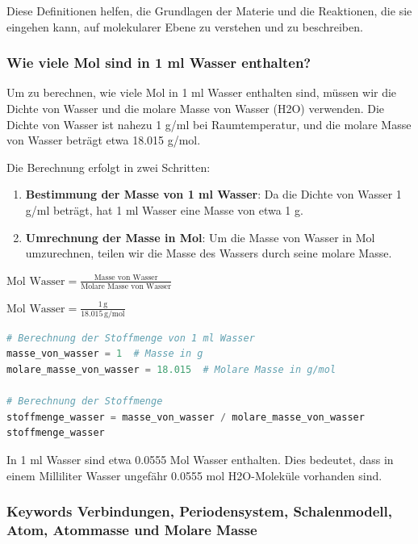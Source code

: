 \documentclass{vorlage-design-main}
\begin{document}
Diese Definitionen helfen, die Grundlagen der Materie und die
Reaktionen, die sie eingehen kann, auf molekularer Ebene zu verstehen
und zu beschreiben.

\hypertarget{wie-viele-mol-sind-in-1-ml-wasser-enthalten}{%
\subsubsection{Wie viele Mol sind in 1 ml Wasser
enthalten?}\label{wie-viele-mol-sind-in-1-ml-wasser-enthalten}}

Um zu berechnen, wie viele Mol in 1 ml Wasser enthalten sind, müssen wir
die Dichte von Wasser und die molare Masse von Wasser (H2O) verwenden.
Die Dichte von Wasser ist nahezu 1 g/ml bei Raumtemperatur, und die
molare Masse von Wasser beträgt etwa 18.015 g/mol.

Die Berechnung erfolgt in zwei Schritten:

\begin{enumerate}
\def\labelenumi{\arabic{enumi}.}

\item
  \textbf{Bestimmung der Masse von 1 ml Wasser}: Da die Dichte von
  Wasser 1 g/ml beträgt, hat 1 ml Wasser eine Masse von etwa 1 g.
\item
  \textbf{Umrechnung der Masse in Mol}: Um die Masse von Wasser in Mol
  umzurechnen, teilen wir die Masse des Wassers durch seine molare
  Masse.
\end{enumerate}

$\text{Mol Wasser} = \frac{\text{Masse von Wasser}}{\text{Molare Masse von Wasser}}$

$\text{Mol Wasser} = \frac{1 \, \text{g}}{18.015 \, \text{g/mol}}$

\begin{lstlisting}[language=Python]
# Berechnung der Stoffmenge von 1 ml Wasser
masse_von_wasser = 1  # Masse in g
molare_masse_von_wasser = 18.015  # Molare Masse in g/mol

# Berechnung der Stoffmenge
stoffmenge_wasser = masse_von_wasser / molare_masse_von_wasser
stoffmenge_wasser
\end{lstlisting}

In 1 ml Wasser sind etwa 0.0555 Mol Wasser enthalten. Dies bedeutet,
dass in einem Milliliter Wasser ungefähr 0.0555 mol H2O-Moleküle
vorhanden sind.

\hypertarget{keywords-verbindungen-periodensystem-schalenmodell-atom-atommasse-und-molare-masse}{%
\subsubsection{Keywords Verbindungen, Periodensystem, Schalenmodell,
Atom, Atommasse und Molare
Masse}\label{keywords-verbindungen-periodensystem-schalenmodell-atom-atommasse-und-molare-masse}}
\end{document}
